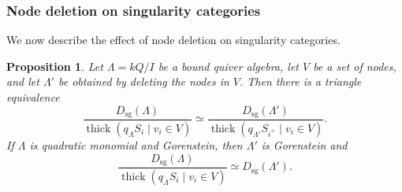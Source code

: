 \documentclass[11pt]{article}
\providecommand{\varLambda}{\Lambda}
\newtheorem{proposition}[theorem]{Proposition}
\theoremstyle{definition}
\begin{document}
		\subsubsection{Node deletion on singularity categories}

			We now describe the effect of node deletion on singularity categories.

			\begin{proposition}\label{proposition of node singularity quotients}
				Let $\varLambda=kQ/I$ be a bound quiver algebra, let $V$ be a set of nodes, and let $\varLambda'$ be obtained by deleting the nodes in $V$. Then there is a triangle equivalence
				\begin{equation}\label{eq node singularity quotients}
					\frac{D_{\mathrm{sg}}(\varLambda)}
					{\operatorname{thick}(q_{\varLambda}S_i\mid v_i\in V)}
					\simeq
					\frac{D_{\mathrm{sg}}(\varLambda')}
					{\operatorname{thick}(q_{\varLambda'}S_{i^+}\mid v_i\in V)}.
				\end{equation}
				If $\varLambda$ is quadratic monomial and Gorenstein, then $\varLambda'$ is Gorenstein and
				\[
					\frac{D_{\mathrm{sg}}(\varLambda)}
					{\operatorname{thick}(q_{\varLambda}S_i\mid v_i\in V)}
					\simeq D_{\mathrm{sg}}(\varLambda').
				\]
			\end{proposition}
\end{document}
